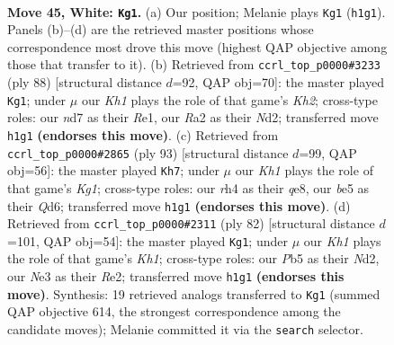 \documentclass[11pt]{article}
\begin{document}
\clearpage

\begin{figure}[p]\centering
\begin{subfigure}{0.46\textwidth}\centering
\resizebox{\linewidth}{!}{%
\newchessgame
\chessboard[
  setfen={r5k1/3n4/1q1p4/1P2b2p/p6r/P1N1N3/R3Q3/2R4K w - - 0 45},
  showmover=false,
  pgfstyle=straightmove, color=movearrow, markmove={h1-g1}
]}
\caption{}
\end{subfigure}\hfill
\begin{subfigure}{0.46\textwidth}\centering
\resizebox{\linewidth}{!}{%
\newchessgame
\chessboard[
  setfen={5r1k/5r1p/2p5/7q/Pp1P1p2/1Q2N3/1P1NR2K/4R3 w - - 0 45},
  showmover=false,
  pgfstyle=straightmove, color=movearrow, markmove={h2-g1}
]}
\caption{}
\end{subfigure}
\\[4pt]
\begin{subfigure}{0.46\textwidth}\centering
\resizebox{\linewidth}{!}{%
\newchessgame
\chessboard[
  setfen={4Q1k1/6r1/p2q1r1p/1p4n1/3N3R/1P6/2P5/1K5R b - - 6 47},
  showmover=false,
  pgfstyle=straightmove, color=movearrow, markmove={g8-h7}
]}
\caption{}
\end{subfigure}\hfill
\begin{subfigure}{0.46\textwidth}\centering
\resizebox{\linewidth}{!}{%
\newchessgame
\chessboard[
  setfen={1r3r1k/6p1/3P3p/P6q/6n1/3Q2P1/3NR3/5R1K w - - 4 42},
  showmover=false,
  pgfstyle=straightmove, color=movearrow, markmove={h1-g1}
]}
\caption{}
\end{subfigure}
\caption{\textbf{Move 45, White: \texttt{Kg1}.} (a) Our position; Melanie plays \texttt{Kg1} (\texttt{h1g1}). Panels (b)--(d) are the retrieved master positions whose correspondence most drove this move (highest QAP objective among those that transfer to it). (b) Retrieved from \texttt{ccrl\_top\_p0000\#3233} (ply 88) [structural distance $d$=92, QAP obj=70]: the master played \texttt{Kg1}; under $\mu$ our \emph{Kh1} plays the role of that game's \emph{Kh2}; cross-type roles: our \emph{n}d7 as their \emph{R}e1, our \emph{R}a2 as their \emph{N}d2; transferred move \texttt{h1g1} \textbf{(endorses this move)}. (c) Retrieved from \texttt{ccrl\_top\_p0000\#2865} (ply 93) [structural distance $d$=99, QAP obj=56]: the master played \texttt{Kh7}; under $\mu$ our \emph{Kh1} plays the role of that game's \emph{Kg1}; cross-type roles: our \emph{r}h4 as their \emph{q}e8, our \emph{b}e5 as their \emph{Q}d6; transferred move \texttt{h1g1} \textbf{(endorses this move)}. (d) Retrieved from \texttt{ccrl\_top\_p0000\#2311} (ply 82) [structural distance $d$=101, QAP obj=54]: the master played \texttt{Kg1}; under $\mu$ our \emph{Kh1} plays the role of that game's \emph{Kh1}; cross-type roles: our \emph{P}b5 as their \emph{N}d2, our \emph{N}e3 as their \emph{R}e2; transferred move \texttt{h1g1} \textbf{(endorses this move)}. Synthesis: 19 retrieved analogs transferred to \texttt{Kg1} (summed QAP objective 614, the strongest correspondence among the candidate moves); Melanie committed it via the \texttt{search} selector.}
\label{fig:thought-m88}
\end{figure}
\end{document}
